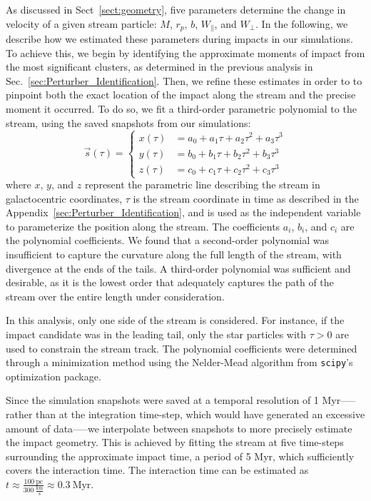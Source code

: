 \documentclass[draft]{aa}
\begin{document}
\begin{appendix}
    As discussed in Sect~\ref{sect:geometry},  five parameters determine the change in velocity of a given stream particle: $M$, $r_p$, $b$, $W_\parallel$, and $W_\perp$. In the following, we describe how we estimated these parameters during impacts in our simulations.
    To achieve this, we begin by identifying the approximate moments of impact from the most significant clusters, as determined in the previous analysis in Sec.~\ref{sec:Perturber_Identification}. Then, we refine these estimates in order to to pinpoint both the exact location of the impact along the stream and the precise moment it occurred. To do so, we fit a third-order parametric polynomial to the stream, using the saved snapshots from our simulations:
      \begin{equation}
        \vec{s}(\tau) = 
        \left\{
          \begin{aligned}
            x(\tau) &= a_0 + a_1 \tau + a_2 \tau^2 + a_3 \tau^3 \\ 
            y(\tau) &= b_0 + b_1 \tau + b_2 \tau^2 + b_3 \tau^3 \\
            z(\tau) &= c_0 + c_1 \tau + c_2 \tau^2 + c_3 \tau^3
          \end{aligned}
        \right.
        \end{equation}  
      where $x$, $y$, and $z$ represent the parametric line describing the stream in galactocentric coordinates, $\tau$ is the stream coordinate in time as described in the Appendix~\ref{sec:Perturber_Identification}, and is used as the independent variable to parameterize the position along the stream. The coefficients $a_i$, $b_i$, and $c_i$ are the polynomial coefficients. We found that a second-order polynomial was insufficient to capture the curvature along the full length of the stream, with divergence at the ends of the tails. A third-order polynomial was sufficient and desirable, as it is the lowest order that adequately captures the path of the stream over the entire length under consideration.

      In this analysis, only one side of the stream is considered. For instance, if the impact candidate was in the leading tail, only the star particles with $\tau > 0$ are used to constrain the stream track. The polynomial coefficients were determined through a minimization method using the Nelder-Mead algorithm from \texttt{scipy}'s optimization package.

      Since the simulation snapshots were saved at a temporal resolution of 1 Myr--—rather than at the integration time-step, which would have generated an excessive amount of data—--we interpolate between snapshots to more precisely estimate the impact geometry. This is achieved by fitting the stream at five time-steps surrounding the approximate impact time, a period of 5 Myr, which sufficiently covers the interaction time. The interaction time can be estimated as $t \approx \frac{100~\text{pc}}{300~\frac{\text{km}}{\text{s}}} \approx 0.3~\text{Myr}$.


\end{appendix}
\end{document}
